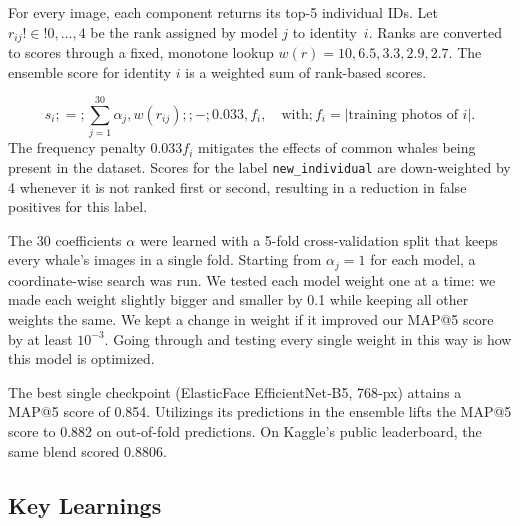 \documentclass[twocolumn]{article}
\begin{document}
For every image, each component returns its top-5 individual IDs. Let $r_{ij}!\in!{0,\dots,4}$ be the rank assigned by model $j$ to identity~$i$. Ranks are converted to scores through a fixed, monotone lookup $w(r)={10,6.5,3.3,2.9,2.7}$. The ensemble score for identity $i$ is a weighted sum of rank-based scores.

\begin{equation}
s_i;=;\sum_{j=1}^{30} \alpha_j,w(r_{ij});;{-};0.033,f_i,\quad\text{with};f_i=|{\text{training photos of }i}|.
\end{equation}
The frequency penalty $0.033 f_i$ mitigates the effects of common whales being present in the dataset. Scores for the label \texttt{new_individual} are down-weighted by 4 whenever it is not ranked first or second, resulting in a reduction in false positives for this label. 

The 30 coefficients ${\alpha}$ were learned with a 5-fold cross-validation split that keeps every whale's images in a single fold. Starting from $\alpha_j = 1$ for each model, a coordinate-wise search was run. We tested each model weight one at a time: we made each weight slightly bigger and smaller by 0.1 while keeping all other weights the same. We kept a change in weight if it improved our MAP@5 score by at least $10^{-3}$. Going through and testing every single weight in this way is how this model is optimized.

The best single checkpoint (ElasticFace EfficientNet‑B5, 768‑px) attains a MAP@5 score of 0.854. Utilizings its predictions in the ensemble lifts the MAP@5 score to 0.882 on  out-of-fold predictions. On Kaggle's public leaderboard, the same blend scored 0.8806.

\subsection{Key Learnings}
\end{document}
